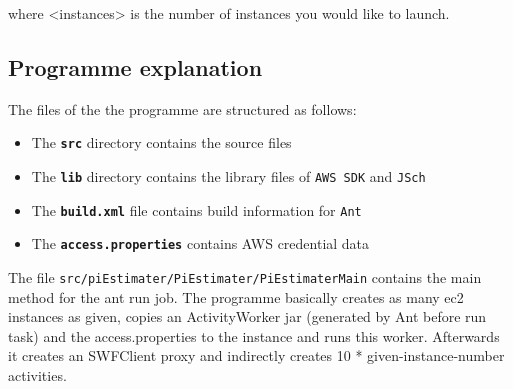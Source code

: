 \documentclass{article}
\begin{document}
where <instances> is the number of instances you would like to launch.

\subsection{Programme explanation}
The files of the the programme are structured as follows:

\begin{itemize}
\item The \texttt{\textbf{src}} directory contains the source files
\item The \texttt{\textbf{lib}} directory contains the library files of \texttt{AWS SDK} and \texttt{JSch}
\item The \texttt{\textbf{build.xml}} file contains build information for \texttt{Ant}
\item The \texttt{\textbf{access.properties}} contains AWS credential data
\end{itemize}

The file \texttt{src/\-piEstimater/\-PiEstimater/\-PiEstimaterMain} contains the main method for the ant run job. The programme basically creates as many ec2 instances as given, copies an ActivityWorker jar (generated by Ant before run task) and the access.properties to the instance and runs this worker. Afterwards it creates an SWFClient proxy and indirectly creates 10 * given-instance-number activities.





\end{document}
